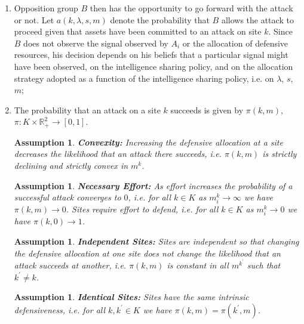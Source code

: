 \documentclass[12pt]{article}
\newtheorem{assumption}[]{Assumption}
\begin{document}
\begin{enumerate}
\item Opposition group $B$ then has the opportunity to go forward with the attack or not.  Let $a(k,\lambda,s,m)$ denote the probability that $B$ allows the attack to proceed given that assets have been committed to an attack on site $k$.  Since $B$ does not observe the signal observed by $A_i$ or the allocation of defensive resources, his decision depends on his beliefs that a particular signal might have been observed, on the intelligence sharing policy, and on the allocation strategy adopted as a function of the intelligence sharing policy, i.e. on $\lambda$, $s$, $m$;

\item The probability that an attack on a site $k$ succeeds is given by $\pi(k,m)$, $\pi : K\times \mathbb{R}^2_+ \to [0, 1]$. 

\begin{assumption}  \textbf{Convexity:}  Increasing the defensive allocation at a site decreases the likelihood that an attack there succeeds, i.e. $\pi(k,m)$ is strictly declining and strictly convex in $m^k$.  \label{convexity}
\end{assumption}

\begin{assumption}  \textbf{Necessary Effort:}  As effort increases the probability of a successful attack converges to $0$, i.e. for all $k\in K$ as $m_i^k\to\infty$ we have $\pi(k,m)\to0$.  Sites require effort to defend, i.e. for all $k\in K$ as $m_i^k\to0$ we have $\pi(k,0)\to 1$.\label{endpoints}
\end{assumption}

\begin{assumption}  \textbf{Independent Sites:}  Sites are independent so that changing the defensive allocation at one site does not change the likelihood that an attack succeeds at another, i.e. $\pi(k,m)$ is constant in all $m^{k^\prime}$ such that $k^{\prime}\neq k$.\label{independence}
\end{assumption}

\begin{assumption} \textbf{Identical Sites:}  Sites have the same intrinsic defensiveness, i.e. for all $k,k^{\prime}\in K$ we have $\pi(k,m)=\pi(k^{\prime},m)$.\label{equality}
\end{assumption}

\end{enumerate}
\end{document}
